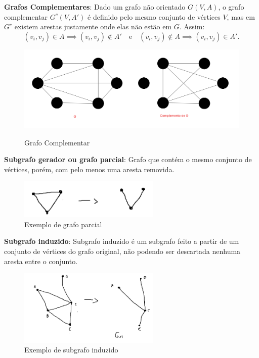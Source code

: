 \textbf{Grafos Complementares}:
Dado um grafo não orientado $G(V,A)$, o grafo complementar $G^c(V,A')$ é definido pelo mesmo conjunto de vértices $V$, mas em $G^c$ existem arestas justamente onde elas não estão em $G$. Assim:
\[
(v_i, v_j) \in A \implies (v_i, v_j) \notin A' \quad \text{e} \quad (v_i, v_j) \notin A \implies (v_i, v_j) \in A'.
\]

\begin{figure} [H]
	\centering
	\caption{Grafo Complementar}%
	\label{fig:complementar}%
	\includegraphics[width=0.4\linewidth,angle=0]{figuras/grafo_complemetnar.png}%
	\\
\end{figure}

\textbf{Subgrafo gerador ou grafo parcial}:  
Grafo que contém o mesmo conjunto de vértices, porém, com pelo menos uma aresta removida.

\begin{figure}[H]
    \centering
    \includegraphics[width=0.6\textwidth]{figuras/Subgrafogerador.png}
    \caption{Exemplo de grafo parcial}
\end{figure}

\medskip

\textbf{Subgrafo induzido}:  
Subgrafo induzido é um subgrafo feito a partir de um conjunto de vértices do grafo original, não podendo ser descartada nenhuma aresta entre o conjunto.

\begin{figure}[H]
    \centering
    \includegraphics[width=0.6\textwidth]{figuras/Subgrafoinduzido.png}
    \caption{Exemplo de subgrafo induzido}
\end{figure}

